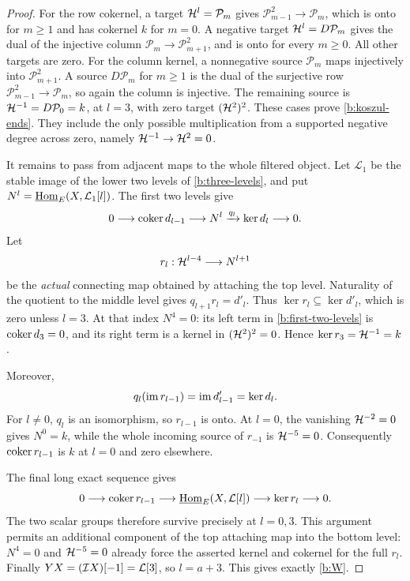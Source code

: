 \begin{proof}
For the row cokernel, a target \(\mathcal H^l=\mathcal P_m\) gives
\(\mathcal P_{m-1}^2\to\mathcal P_m\), which is onto for \(m\geq1\)
and has cokernel \(k\) for \(m=0\).  A negative target
\(\mathcal H^l=D\mathcal P_m\) gives the dual of the injective column
\(\mathcal P_m\to\mathcal P_{m+1}^2\), and is onto for every
\(m\geq0\).  All other targets are zero.
For the column kernel, a nonnegative source \(\mathcal P_m\) maps
injectively into \(\mathcal P_{m+1}^2\).
A source \(D\mathcal P_m\) for \(m\geq1\) is the dual of the
surjective row \(\mathcal P_{m-1}^2\to\mathcal P_m\), so again the
column is injective.  The remaining source is
\(\mathcal H^{-1}=D\mathcal P_0=k\), at \(l=3\), with zero target
\((\mathcal H^2)^2\).  These cases prove \eqref{b:koszul-ends}.
They include the only possible multiplication from a supported
negative degree across zero, namely \(\mathcal H^{-1}\to\mathcal H^2=0\).

It remains to pass from adjacent maps to the whole filtered
object.  Let \(\mathcal L_1\) be the stable image of the lower two
levels of \eqref{b:three-levels}, and put
\(N^l=\underline{\operatorname{Hom}}_E(X,\mathcal L_1[l])\).
The first two levels give
\begin{equation}\label{b:first-two-levels}
 0\longrightarrow\operatorname{coker} d_{l-1}\longrightarrow N^l
 \xrightarrow{q_l}\ker d_l\longrightarrow0.
\end{equation}
Let
\[
 r_l:\mathcal H^{l-4}\longrightarrow N^{l+1}
\]
be the \emph{actual} connecting map obtained by attaching the top
level.  Naturality of the quotient to the middle level gives
\(q_{l+1}r_l=d'_l\).
Thus \(\ker r_l\subseteq\ker d'_l\), which is zero unless \(l=3\).
At that index \(N^4=0\): its left term in
\eqref{b:first-two-levels} is \(\operatorname{coker} d_3=0\), and its right term
is a kernel in \((\mathcal H^2)^2=0\).  Hence
\(\ker r_3=\mathcal H^{-1}=k\).

Moreover,
\[
 q_l(\operatorname{im} r_{l-1})=\operatorname{im} d'_{l-1}=\ker d_l.
\]
For \(l\ne0\), \(q_l\) is an isomorphism, so \(r_{l-1}\) is onto.
At \(l=0\), the vanishing \(\mathcal H^{-2}=0\) gives \(N^0=k\), while
the whole incoming source of \(r_{-1}\) is \(\mathcal H^{-5}=0\).
Consequently \(\operatorname{coker} r_{l-1}\) is \(k\) at \(l=0\) and zero
elsewhere.

The final long exact sequence gives
\[
 0\longrightarrow\operatorname{coker} r_{l-1}
 \longrightarrow\underline{\operatorname{Hom}}_E(X,\mathcal L[l])
 \longrightarrow\ker r_l\longrightarrow0.
\]
The two scalar groups therefore survive precisely at \(l=0,3\).
This argument permits an additional component of the top attaching
map into the bottom level: \(N^4=0\) and \(\mathcal H^{-5}=0\) already
force the asserted kernel and cokernel for the full \(r_l\).
Finally \(YX=(\mathcal I X)[-1]=\mathcal L[3]\), so \(l=a+3\).
This gives exactly \eqref{b:W}.
\end{proof}

